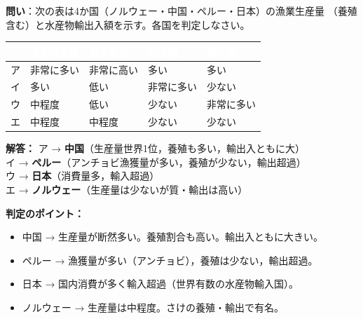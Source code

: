 \documentclass[a4paper,11pt]{article}
\newcommand{\imp}[1]{\textbf{\textcolor{mainred}{#1}}}
\begin{document}
\begin{tcolorbox}[testbox, title={〔共通テスト類題②〕水産業・漁業の統計グラフ読解}]
\textbf{問い}：次の表は4か国（ノルウェー・中国・ペルー・日本）の漁業生産量
（養殖含む）と水産物輸出入額を示す。各国を判定しなさい。

\begin{center}
\begin{tabular}{C{1.2cm}C{2.5cm}C{2.5cm}C{2.5cm}C{2.5cm}}
\toprule
{}\textcolor{white}{\textbf{}} & \textcolor{white}{\textbf{漁業生産量}} & \textcolor{white}{\textbf{養殖割合}} & \textcolor{white}{\textbf{輸出額}} & \textcolor{white}{\textbf{輸入額}} \\
\midrule
ア & 非常に多い & 非常に高い & 多い & 多い \\
イ & 多い & 低い & 非常に多い & 少ない \\
ウ & 中程度 & 低い & 少ない & 非常に多い \\
エ & 中程度 & 中程度 & 少ない & 少ない \\
\bottomrule
\end{tabular}
\end{center}

\medskip
\textbf{解答：}
ア → \imp{中国}（生産量世界1位，養殖も多い，輸出入ともに大）\\
イ → \imp{ペルー}（アンチョビ漁獲量が多い，養殖が少ない，輸出超過）\\
ウ → \imp{日本}（消費量多，輸入超過）\\
エ → \imp{ノルウェー}（生産量は少ないが質・輸出は高い）

\medskip
\textbf{判定のポイント：}
\begin{itemize}[leftmargin=1em]
  \item 中国 → 生産量が断然多い。養殖割合も高い。輸出入ともに大きい。
  \item ペルー → 漁獲量が多い（アンチョビ），養殖は少ない，輸出超過。
  \item 日本 → 国内消費が多く輸入超過（世界有数の水産物輸入国）。
  \item ノルウェー → 生産量は中程度。さけの養殖・輸出で有名。
\end{itemize}
\end{tcolorbox}

\vspace{3mm}
\end{document}
